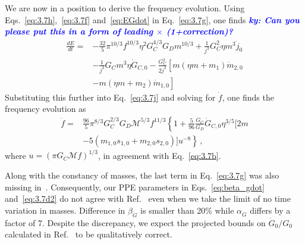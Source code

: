 \documentclass[prd,twocolumn,nofootinbib]{revtex4-1}
\newcommand{\ky}[1]{\textcolor{blue}{\it{\textbf{ky: #1}}} }
\begin{document}
We are now in a position to derive the frequency evolution. 
Using Eqs.~\eqref{eq:3.7h},~\eqref{eq:3.7f} and~\eqref{eq:EGdot} in Eq.~\eqref{eq:3.7g}, one finds \ky{Can you please put this in a form of leading $\times$ (1+correction)?}
 \begin{align}\label{eq:3.7i}
\frac{d E}{d t}=&-\frac{32}{5} \pi ^{10/3} f^{10/3} \eta ^2 G_C^{4/3}G_D m^{10/3}+\frac{1}{j^3} G_C^2\eta m^3\dot{j}_0 \nonumber\\&-\frac{1}{j^2}G_C m^3\eta\dot{G}_{C,0}-\frac{G_C^2}{2 j^2} \left[m(\eta  m+m_1)\dot{m}_{2,0}\right.\nonumber\\& \left.-m (\eta  m+m_2)\dot{m}_{1,0}\right]
 \end{align}
Substituting this further into Eq.~\eqref{eq:3.7j} and solving for $\dot f$, one finds the frequency evolution as
 \begin{align} 
 \dot{f}=&\frac{96}{5}\pi^{8/3}G_C^{2/3}G_D\mathcal{M}^{5/3}f^{11/3}\left\{1+\frac{5}{96}\frac{G_C}{G_D} \dot{G}_{C,0} \eta^{3/5}[2m\right.\nonumber\\ 
 & \left.-5(m_{1,0}s_{1,0}+m_{2,0}s_{2,0})] u^{-8}\right\}\,,
 \end{align} 
where $u=(\pi G_C \mathcal{M}f)^{1/3}$, in agreement with Eq.~\eqref{eq:3.7b}.

Along with the constancy of masses, the last term in Eq.~\eqref{eq:3.7g} was also missing in~\cite{Yunes:2009bv}. Consequently, our PPE parameters in Eqs.~\eqref{eq:beta_gdot} and~\eqref{eq:3.7d2} do not agree with Ref.~\cite{Yunes:2009bv} even when we take the limit of no time variation in masses. Difference in $\beta_{\dot G}$ is smaller than 20\% while $\alpha_{\dot G}$ differs by a factor of 7. Despite the discrepancy, we expect the projected bounds on $\dot{G}_0/G_0$ calculated in Ref.~\cite{Yunes:2009bv} to be qualitatively correct.

%
%

\end{document}
